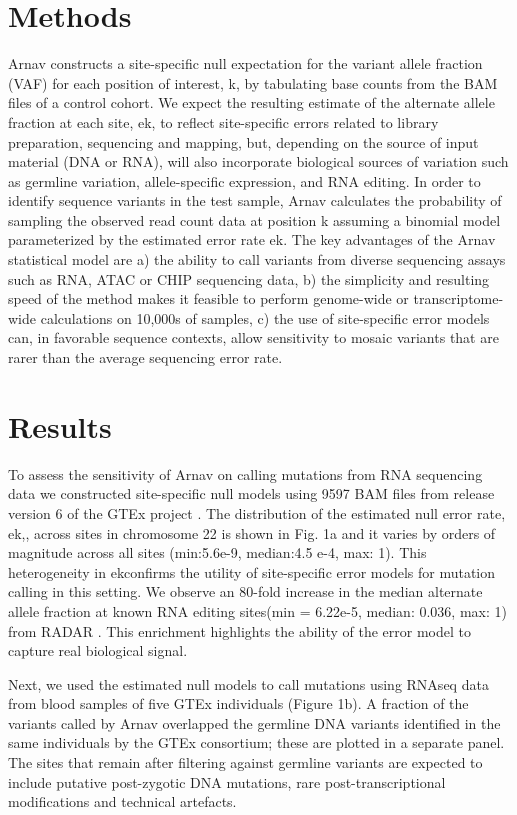 \section{Methods}

Arnav constructs a site-specific null expectation for the variant allele fraction (VAF) for each position of interest, k, by tabulating base counts from the BAM files of a control cohort. We expect the resulting estimate of the alternate allele fraction at each site, ek, to reflect site-specific errors related to library preparation, sequencing and mapping, but, depending on the source of input material (DNA or RNA), will also incorporate biological sources of variation such as germline variation, allele-specific expression, and RNA editing. In order to identify sequence variants in the test sample, Arnav calculates the probability of sampling the observed read count data at position k assuming a binomial model parameterized by the estimated error rate ek. The key advantages of the Arnav statistical model are a) the ability to call variants from diverse sequencing assays such as RNA, ATAC or CHIP sequencing data, b) the simplicity and resulting speed of the method makes it feasible to perform genome-wide or transcriptome-wide calculations on 10,000s of samples, c) the use of site-specific error models can, in favorable sequence contexts, allow sensitivity to mosaic variants that are rarer than the average sequencing error rate.


\section{Results}

To assess the sensitivity of Arnav on calling mutations from RNA sequencing data we constructed site-specific null models using 9597 BAM files from release version 6 of the GTEx project \cite{gtex_consortium_genetic_2017}. The distribution of the estimated null error rate, ek,, across sites in chromosome 22 is shown in Fig. 1a and it varies by orders of magnitude across all sites (min:5.6e-9, median:4.5 e-4, max: 1). This heterogeneity in ekconfirms the utility of site-specific error models for mutation calling in this setting. We observe an 80-fold increase in the median alternate allele fraction at known RNA editing sites(min = 6.22e-5, median: 0.036, max: 1) from RADAR \cite{ramaswami2014nar}. This enrichment highlights the ability of the error model to capture real biological signal.

Next, we used the estimated null models to call mutations using RNAseq data from blood samples of five GTEx individuals (Figure 1b). A fraction of the variants called by Arnav overlapped the germline DNA variants identified in the same individuals by the GTEx consortium; these are plotted in a separate panel. The sites that remain after filtering against germline variants are expected to include putative post-zygotic DNA mutations, rare post-transcriptional modifications and technical artefacts.

